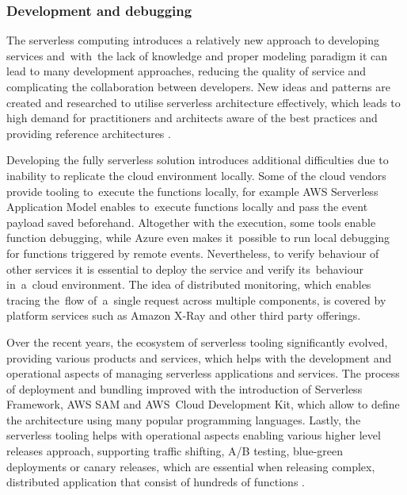 \subsubsection{Development and debugging} \label{chapter:serverless-development-and-debugging}

The serverless computing introduces a relatively new approach to developing services and~with~the lack of knowledge and proper modeling paradigm it can lead to many development approaches, reducing the quality of service and complicating the collaboration between developers. New ideas and patterns are created and researched to utilise serverless architecture effectively, which leads to high demand for practitioners and architects aware of the best practices and providing reference architectures \cite{ServerlessComputingSurveyOfOpportunitiesChallengesApplications}.

Developing the fully serverless solution introduces additional difficulties due to inability to replicate the cloud environment locally. Some of the cloud vendors provide tooling to~execute the functions locally, for example AWS Serverless Application Model enables to~execute functions locally and pass the event payload saved beforehand. Altogether with the execution, some tools enable function debugging, while Azure even makes it~possible to run local debugging for functions triggered by remote events. Nevertheless, to verify behaviour of other services it is essential to deploy the service and verify its~behaviour in~a~cloud environment. The idea of distributed monitoring, which enables tracing the~flow of~a~single request across multiple components, is covered by platform services such as Amazon X-Ray and other third party offerings.

Over the recent years, the ecosystem of serverless tooling significantly evolved, providing various products and services, which helps with the development and operational aspects of managing serverless applications and services. The process of deployment and bundling improved with the introduction of Serverless Framework, AWS SAM and AWS~Cloud Development Kit, which allow to define the architecture using many popular programming languages. Lastly, the serverless tooling helps with operational aspects enabling various higher level releases approach, supporting traffic shifting, A/B testing, blue-green deployments or canary releases, which are essential when releasing complex, distributed application that consist of hundreds of functions \cite{MartinFowlerServerless}.

